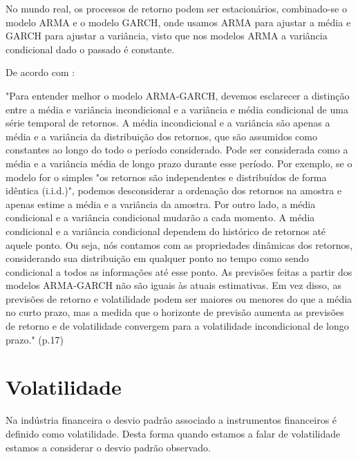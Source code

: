 \documentclass[
  12pt,
  a4paper,
  openany]{book}
\theoremstyle{definition}
\theoremstyle{definition}
\theoremstyle{definition}
\theoremstyle{remark}
\begin{document}
No mundo real, os processos de retorno podem ser estacionários, combinado-se o modelo ARMA e o modelo GARCH, onde usamos ARMA para ajustar a média e GARCH para ajustar a variância, visto que nos modelos ARMA a variância condicional dado o passado é constante.

De acordo com \citet{oscar}:

\begin{spacing}{1}
\begin{adjustwidth}{28.3464pt}{28.3464pt}\footnotesize
"Para entender melhor o modelo ARMA-GARCH, devemos esclarecer a distinção entre a média e variância incondicional e a variância e média  condicional de uma série temporal de retornos. A média incondicional e a variância são apenas a média e a variância da distribuição dos retornos, que são assumidos como constantes ao longo do todo o período considerado. Pode ser considerada como a média e a variância média de longo prazo durante esse período. Por exemplo, se o modelo for o simples "os retornos são independentes e distribuídos de forma idêntica (i.i.d.)", podemos desconsiderar a ordenação dos retornos na amostra e apenas estime a média e a variância da amostra.
Por outro lado, a média condicional e a variância condicional mudarão a cada momento. A média condicional e a variância condicional dependem do histórico de retornos até aquele ponto. Ou seja, nós contamos com as propriedades dinâmicas dos retornos, considerando sua distribuição em qualquer ponto no tempo como sendo condicional a todos as informações até esse ponto. As previsões feitas a partir dos modelos ARMA-GARCH não são iguais às atuais estimativas. Em vez disso, as previsões de retorno e volatilidade podem ser maiores ou menores do que a média no curto prazo, mas a medida que o horizonte de previsão aumenta as previsões de retorno e de volatilidade convergem para a volatilidade incondicional de longo prazo." (p.17)
\normalsize\end{adjustwidth}
\end{spacing}
\medskip

\hypertarget{volatilidade}{%
\section{Volatilidade}\label{volatilidade}}

Na indústria financeira o desvio padrão associado a instrumentos financeiros é definido como volatilidade. Desta forma quando estamos a falar de volatilidade estamos a considerar o desvio padrão observado.
\end{document}
